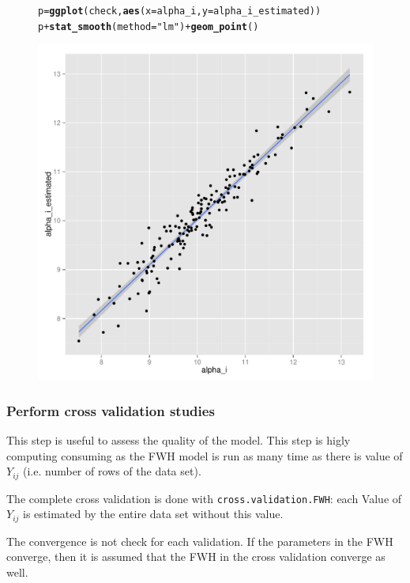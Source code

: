 \documentclass{article}\usepackage[]{graphicx}\usepackage[]{color}
\makeatletter
\newcommand{\hlstr}[1]{\textcolor[rgb]{0.192,0.494,0.8}{#1}}%
\newcommand{\hlopt}[1]{\textcolor[rgb]{0,0,0}{#1}}%
\newcommand{\hlstd}[1]{\textcolor[rgb]{0.345,0.345,0.345}{#1}}%
\newcommand{\hlkwb}[1]{\textcolor[rgb]{0.69,0.353,0.396}{#1}}%
\newcommand{\hlkwc}[1]{\textcolor[rgb]{0.333,0.667,0.333}{#1}}%
\newcommand{\hlkwd}[1]{\textcolor[rgb]{0.737,0.353,0.396}{\textbf{#1}}}%
\newenvironment{kframe}{%
 \def\at@end@of@kframe{}%
 \ifinner\ifhmode%
  \def\at@end@of@kframe{\end{minipage}}%
  \begin{minipage}{\columnwidth}%
 \fi\fi%
 \def\FrameCommand##1{\hskip\@totalleftmargin \hskip-\fboxsep
 \colorbox{shadecolor}{##1}\hskip-\fboxsep
     \hskip-\linewidth \hskip-\@totalleftmargin \hskip\columnwidth}%
 \MakeFramed {\advance\hsize-\width
   \@totalleftmargin\z@ \linewidth\hsize
   \@setminipage}}%
 {\par\unskip\endMakeFramed%
 \at@end@of@kframe}
\newenvironment{knitrout}{}{} %
\makeatother
\begin{document}
\begin{figure}[H]
\begin{knitrout}
\color{fgcolor}\begin{kframe}
\begin{alltt}
\hlstd{p} \hlkwb{=} \hlkwd{ggplot}\hlstd{(check,} \hlkwd{aes}\hlstd{(}\hlkwc{x} \hlstd{= alpha_i,} \hlkwc{y} \hlstd{= alpha_i_estimated))}
\hlstd{p} \hlopt{+} \hlkwd{stat_smooth}\hlstd{(}\hlkwc{method} \hlstd{=} \hlstr{"lm"}\hlstd{)} \hlopt{+} \hlkwd{geom_point}\hlstd{()}
\end{alltt}
\end{kframe}

{\centering \includegraphics[width=.6\textwidth]{figures/PPBstats_unnamed-chunk-39-1} 

}



\end{knitrout}
\end{figure}


\subsubsection{Perform cross validation studies}

This step is useful to assess the quality of the model.
This step is higly computing consuming as the FWH model is run as many time as there is value of $Y_{ij}$ (i.e. number of rows of the data set).

The complete cross validation is done with \texttt{cross.validation.FWH}: 
each Value of $Y_{ij}$ is estimated by the entire data set without this value.

The convergence is not check for each validation. 
If the parameters in the FWH converge, then it is assumed that the FWH in the cross validation converge as well.
\end{document}
